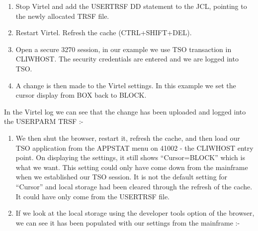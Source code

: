 \documentclass[letterpaper,10pt,english]{sphinxmanual}
\begin{document}
\begin{enumerate}
\def\theenumi{\arabic{enumi}}
\def\labelenumi{\theenumi .}
\makeatletter\def\p@enumii{\p@enumi \theenumi .}\makeatother
\setcounter{enumi}{2}
\item {} 
Stop Virtel and add the USERTRSF DD statement to the JCL, pointing to the newly allocated TRSF file.

\item {} 
Restart Virtel. Refresh the cache (CTRL+SHIFT+DEL).

\item {} 
Open a secure 3270 session, in our example we use TSO transaction in CLIWHOST. The security credentials are entered and we are logged into TSO.

\item {} 
A change is then made to the Virtel settings. In this example we set the cursor display from BOX back to BLOCK.

\end{enumerate}

In the Virtel log we can see that the change has been uploaded and logged into the USERPARM TRSF :-

\begin{sphinxVerbatim}[commandchars=\\\{\}]
           
       
\end{sphinxVerbatim}
\begin{enumerate}
\def\theenumi{\arabic{enumi}}
\def\labelenumi{\theenumi .}
\makeatletter\def\p@enumii{\p@enumi \theenumi .}\makeatother
\setcounter{enumi}{6}
\item {} 
We then shut the browser, restart it, refresh the cache, and then load our TSO application from the APPSTAT menu on 41002 - the CLIWHOST entry point. On displaying the settings, it still shows “Cursor=BLOCK” which is what we want. This setting could only have come down from the mainframe when we established our TSO session. It is not the default setting for “Cursor” and local storage had been cleared through the refresh of the cache. It could have only come from the USERTRSF file.

\item {} 
If we look at the local storage using the developer tools option of the browser, we can see it has been populated with our settings from the mainframe :-

\end{enumerate}
\end{document}
